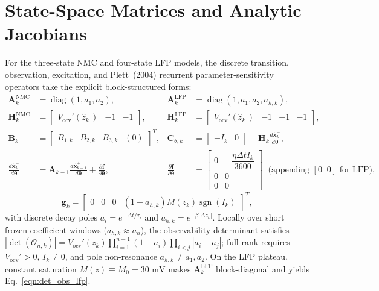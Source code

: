 \documentclass[11pt,a4paper]{article}
\begin{document}
\appendix

\section{State-Space Matrices and Analytic Jacobians\label{app:jacobians}}
For the three-state NMC and four-state LFP models, the discrete transition, observation, excitation, and Plett~(2004) recurrent parameter-sensitivity operators take the explicit block-structured forms:
\begin{align*}
\mathbf{A}_k^{\text{NMC}} &= \operatorname{diag}(1, a_1, a_2), &
\mathbf{A}_k^{\text{LFP}} &= \operatorname{diag}(1, a_1, a_2, a_{h,k}), \\
\mathbf{H}_k^{\text{NMC}} &= \begin{bmatrix} V_{\text{ocv}}'(\hat{z}_k^-) & -1 & -1 \end{bmatrix}, &
\mathbf{H}_k^{\text{LFP}} &= \begin{bmatrix} V_{\text{ocv}}'(\hat{z}_k^-) & -1 & -1 & -1 \end{bmatrix}, \\
\mathbf{B}_k &= \begin{bmatrix} B_{1,k} & B_{2,k} & B_{3,k} & (0) \end{bmatrix}^T, &
\mathbf{C}_{\theta,k} &= \begin{bmatrix} -I_k & 0 \end{bmatrix} + \mathbf{H}_k \frac{d\hat{\mathbf{x}}_k^-}{d\boldsymbol{\theta}}, \\
\frac{d\hat{\mathbf{x}}_k^-}{d\boldsymbol{\theta}} &= \mathbf{A}_{k-1}\frac{d\hat{\mathbf{x}}_{k-1}^+}{d\boldsymbol{\theta}} + \frac{\partial\mathbf{f}}{\partial\boldsymbol{\theta}}, &
\frac{\partial\mathbf{f}}{\partial\boldsymbol{\theta}} &= \begin{bmatrix} 0 & -\dfrac{\eta \Delta t I_k}{3600} \\[4pt] 0 & 0 \\ 0 & 0 \end{bmatrix} \;\; \text{(appending }[0\;\; 0]\text{ for LFP)},
\end{align*}
\begin{equation*}
\mathbf{g}_k = \begin{bmatrix} 0 & 0 & 0 & (1 - a_{h,k}) M(z_k)\operatorname{sgn}(I_k) \end{bmatrix}^T,
\end{equation*}
with discrete decay poles $a_i = e^{-\Delta t/\tau_i}$ and $a_{h,k} = e^{-\beta|\Delta z_k|}$. Locally over short frozen-coefficient windows ($a_{h,k} \approx a_h$), the observability determinant satisfies $|\det(\mathcal{O}_{n,k})| = V_{\text{ocv}}'(z_k) \prod_{i=1}^{n-1}(1 - a_i) \prod_{i < j} |a_i - a_j|$; full rank requires $V_{\text{ocv}}' > 0$, $I_k \ne 0$, and pole non-resonance $a_{h,k} \ne a_1, a_2$. On the LFP plateau, constant saturation $M(z) \equiv M_0 = 30\text{ mV}$ makes $\mathbf{A}_k^{\text{LFP}}$ block-diagonal and yields Eq.~\eqref{eqn:det_obs_lfp}.
\end{document}
